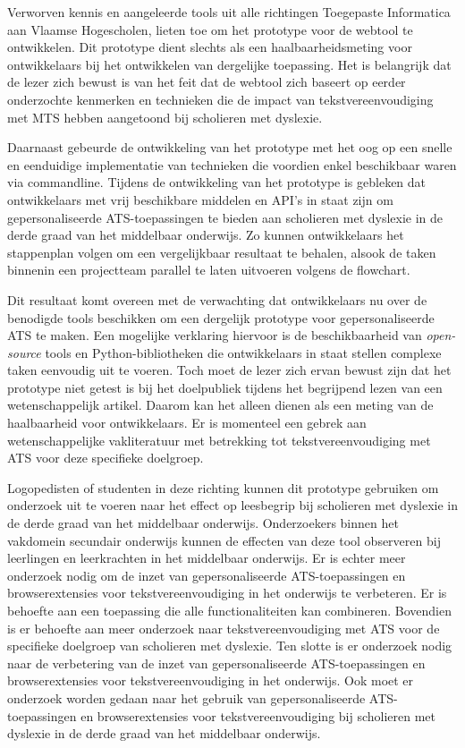 \medspace

Verworven kennis en aangeleerde tools uit alle richtingen Toegepaste Informatica aan Vlaamse Hogescholen, lieten toe om het prototype voor de webtool te ontwikkelen. Dit prototype dient slechts als een haalbaarheidsmeting voor ontwikkelaars bij het ontwikkelen van dergelijke toepassing. Het is belangrijk dat de lezer zich bewust is van het feit dat de webtool zich baseert op eerder onderzochte kenmerken en technieken die de impact van tekstvereenvoudiging met MTS hebben aangetoond bij scholieren met dyslexie. 

Daarnaast gebeurde de ontwikkeling van het prototype met het oog op een snelle en eenduidige implementatie van technieken die voordien enkel beschikbaar waren via commandline. Tijdens de ontwikkeling van het prototype is gebleken dat ontwikkelaars met vrij beschikbare middelen en API's in staat zijn om gepersonaliseerde ATS-toepassingen te bieden aan scholieren met dyslexie in de derde graad van het middelbaar onderwijs. Zo kunnen ontwikkelaars het stappenplan volgen om een vergelijkbaar resultaat te behalen, alsook de taken binnenin een projectteam parallel te laten uitvoeren volgens de flowchart.

Dit resultaat komt overeen met de verwachting dat ontwikkelaars nu over de benodigde tools beschikken om een dergelijk prototype voor gepersonaliseerde ATS te maken. Een mogelijke verklaring hiervoor is de beschikbaarheid van \textit{open-source} tools en Python-bibliotheken die ontwikkelaars in staat stellen complexe taken eenvoudig uit te voeren. Toch moet de lezer zich ervan bewust zijn dat het prototype niet getest is bij het doelpubliek tijdens het begrijpend lezen van een wetenschappelijk artikel. Daarom kan het alleen dienen als een meting van de haalbaarheid voor ontwikkelaars. Er is momenteel een gebrek aan wetenschappelijke vakliteratuur met betrekking tot tekstvereenvoudiging met ATS voor deze specifieke doelgroep.

Logopedisten of studenten in deze richting kunnen dit prototype gebruiken om onderzoek uit te voeren naar het effect op leesbegrip bij scholieren met dyslexie in de derde graad van het middelbaar onderwijs. Onderzoekers binnen het vakdomein secundair onderwijs kunnen de effecten van deze tool observeren bij leerlingen en leerkrachten in het middelbaar onderwijs. Er is echter meer onderzoek nodig om de inzet van gepersonaliseerde ATS-toepassingen en browserextensies voor tekstvereenvoudiging in het onderwijs te verbeteren. Er is behoefte aan een toepassing die alle functionaliteiten kan combineren. Bovendien is er behoefte aan meer onderzoek naar tekstvereenvoudiging met ATS voor de specifieke doelgroep van scholieren met dyslexie. Ten slotte is er onderzoek nodig naar de verbetering van de inzet van gepersonaliseerde ATS-toepassingen en browserextensies voor tekstvereenvoudiging in het onderwijs. Ook moet er onderzoek worden gedaan naar het gebruik van gepersonaliseerde ATS-toepassingen en browserextensies voor tekstvereenvoudiging bij scholieren met dyslexie in de derde graad van het middelbaar onderwijs.